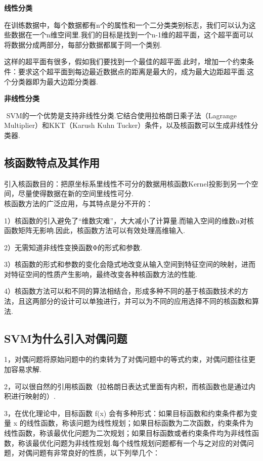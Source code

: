 \textbf{线性分类}

​
在训练数据中，每个数据都有n个的属性和一个二分类类别标志，我们可以认为这些数据在一个n维空间里.我们的目标是找到一个n-1维的超平面，这个超平面可以将数据分成两部分，每部分数据都属于同一个类别.

​
这样的超平面有很多，假如我们要找到一个最佳的超平面.此时，增加一个约束条件：要求这个超平面到每边最近数据点的距离是最大的，成为最大边距超平面.这个分类器即为最大边距分类器.

\textbf{非线性分类}

​ SVM的一个优势是支持非线性分类.它结合使用拉格朗日乘子法（Lagrange
Multiplier）和KKT（Karush Kuhn
Tucker）条件，以及核函数可以生成非线性分类器.

\subsection{核函数特点及其作用}\label{ux6838ux51fdux6570ux7279ux70b9ux53caux5176ux4f5cux7528}

​
引入核函数目的：把原坐标系里线性不可分的数据用核函数Kernel投影到另一个空间，尽量使得数据在新的空间里线性可分.\\
​ 核函数方法的广泛应用，与其特点是分不开的：

1）核函数的引入避免了``维数灾难''，大大减小了计算量.而输入空间的维数n对核函数矩阵无影响.因此，核函数方法可以有效处理高维输入.

2）无需知道非线性变换函数Φ的形式和参数.

3）核函数的形式和参数的变化会隐式地改变从输入空间到特征空间的映射，进而对特征空间的性质产生影响，最终改变各种核函数方法的性能.

4）核函数方法可以和不同的算法相结合，形成多种不同的基于核函数技术的方法，且这两部分的设计可以单独进行，并可以为不同的应用选择不同的核函数和算法.

\subsection{SVM为什么引入对偶问题}\label{svmux4e3aux4ec0ux4e48ux5f15ux5165ux5bf9ux5076ux95eeux9898}

1，对偶问题将原始问题中的约束转为了对偶问题中的等式约束，对偶问题往往更加容易求解.

2，可以很自然的引用核函数（拉格朗日表达式里面有内积，而核函数也是通过内积进行映射的）.

3，在优化理论中，目标函数 f(x)
会有多种形式：如果目标函数和约束条件都为变量 x
的线性函数，称该问题为线性规划；如果目标函数为二次函数，约束条件为线性函数，称该最优化问题为二次规划；如果目标函数或者约束条件均为非线性函数，称该最优化问题为非线性规划.每个线性规划问题都有一个与之对应的对偶问题，对偶问题有非常良好的性质，以下列举几个：


